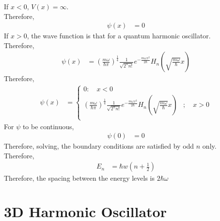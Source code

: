 \documentclass[titlepage, fleqn, a4paper, 12pt, twoside]{article}
\theoremstyle{definition}
\theoremstyle{theorem}
\begin{document}
\begin{solution}
	If $x < 0$, $V(x) = \infty$.\\
	Therefore,
	\begin{align*}
		\psi(x) &= 0
	\end{align*}
	If $x > 0$, the wave function is that for a quantum harmonic oscillator.\\
	Therefore,
	\begin{align*}
		\psi(x) &= \left( \frac{m \omega}{\hbar \pi} \right)^{\frac{1}{4}} \frac{1}{\sqrt{2^n n!}} e^{-\frac{m \omega x^2}{2 \hbar}} H_n \left( \sqrt{\frac{m \omega}{\hbar}} x \right)
	\end{align*}
	Therefore,
	\begin{align*}
		\psi(x) &=
			\begin{cases}
				0 :\quad x < 0\\
				\left( \frac{m \omega}{\hbar \pi} \right)^{\frac{1}{4}} \frac{1}{\sqrt{2^n n!}} e^{-\frac{m \omega x^2}{2 \hbar}} H_n \left( \sqrt{\frac{m \omega}{\hbar}} x \right) &;\quad x > 0\\
			\end{cases}
	\end{align*}
	For $\psi$ to be continuous,
	\begin{align*}
		\psi(0) &= 0
	\end{align*}
	Therefore, solving, the boundary conditions are satisfied by odd $n$ only.\\
	Therefore,
	\begin{align*}
		E_n &= \hbar w \left( n + \frac{1}{2} \right)
	\end{align*}
	Therefore, the spacing between the energy levels is $2 \hbar \omega$
\end{solution}

\section{3D Harmonic Oscillator}
\end{document}
